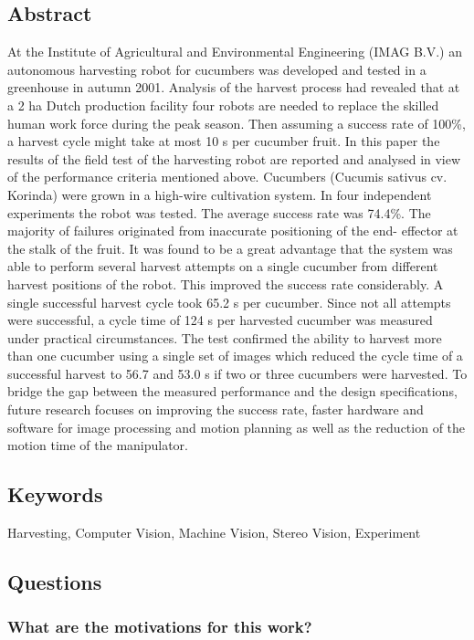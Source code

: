 \documentclass{article}
\begin{document}
\subsection*{Abstract}
At the Institute of Agricultural and Environmental Engineering (IMAG B.V.) an autonomous harvesting
robot for cucumbers was developed and tested in a greenhouse in autumn 2001. Analysis of the harvest
process had revealed that at a 2 ha Dutch production facility four robots are needed to replace the skilled
human work force during the peak season. Then assuming a success rate of 100\%, a harvest cycle might take
at most 10 s per cucumber fruit. In this paper the results of the field test of the harvesting robot are reported
and analysed in view of the performance criteria mentioned above. Cucumbers (Cucumis sativus cv. Korinda)
were grown in a high-wire cultivation system. In four independent experiments the robot was tested. The
average success rate was 74.4\%. The majority of failures originated from inaccurate positioning of the end-
effector at the stalk of the fruit. It was found to be a great advantage that the system was able to perform
several harvest attempts on a single cucumber from different harvest positions of the robot. This improved the
success rate considerably. A single successful harvest cycle took 65.2 s per cucumber. Since not all attempts
were successful, a cycle time of 124 s per harvested cucumber was measured under practical circumstances. The
test confirmed the ability to harvest more than one cucumber using a single set of images which reduced the
cycle time of a successful harvest to 56.7 and 53.0 s if two or three cucumbers were harvested. To bridge the
gap between the measured performance and the design specifications, future research focuses on improving the
success rate, faster hardware and software for image processing and motion planning as well as the reduction
of the motion time of the manipulator.


\subsection*{Keywords} Harvesting, Computer Vision, Machine Vision, Stereo Vision, Experiment

\subsection*{Questions}
\subsubsection*{What are the motivations for this work?}
\end{document}

